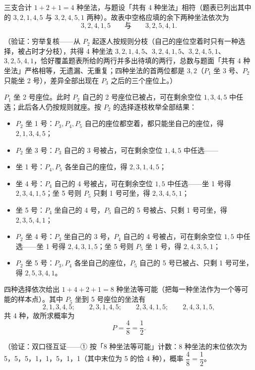 \begin{answer}
三支合计 \(1+2+1=4\) 种坐法，与题设「共有 4 种坐法」相符（题表已列出其中的 \(3,2,1,4,5\) 与 \(3,2,4,5,1\) 两种）。故表中空格应填的余下两种坐法依次为
\nopagebreak[4]
\[
3,2,4,1,5\qquad\text{与}\qquad 3,2,5,4,1 .
\]

（验证：穷举复核——从 \(P_{2}\) 起逐人按规则分枝（自己的座位空着时只有一种选择，被占时才分枝），共得 4 种坐法 \(3,2,1,4,5\)、\(3,2,4,1,5\)、\(3,2,4,5,1\)、\(3,2,5,4,1\)，恰好覆盖题表所给的两行并多出待填的两行，总数与题面「共有 4 种坐法」严格相等，无遗漏、无重复；四种坐法的首两位都是 \(3,2\)（\(P_{1}\) 坐 3 号、\(P_{2}\) 只能坐 2 号），差异全部出现在 \(P_{3}\) 之后的三个座位上。）


\(P_{1}\) 坐 2 号座位。此时 \(P_{2}\) 自己的 2 号座位已被占，可在剩余空位 \(1,3,4,5\) 中任选；此后各人仍按规则就座。按 \(P_{2}\) 的选择逐枝枚举全部结果：

\begin{itemize}
\item \(P_{2}\) 坐 1 号：\(P_{3},P_{4},P_{5}\) 自己的座位都空着，都只能坐自己的座位，得 \(2,1,3,4,5\)；
\item \(P_{2}\) 坐 3 号：\(P_{3}\) 自己的 3 号被占，可在剩余空位 \(1,4,5\) 中任选——
\item 坐 1 号：\(P_{4},P_{5}\) 各坐自己的座位，得 \(2,3,1,4,5\)；
\item 坐 4 号：\(P_{4}\) 自己的 4 号被占，可在剩余空位 \(1,5\) 中任选——坐 1 号得 \(2,3,4,1,5\)；坐 5 号则 \(P_{5}\) 只剩 1 号可坐，得 \(2,3,4,5,1\)；
\item 坐 5 号：\(P_{4}\) 坐自己的 4 号，\(P_{5}\) 自己的 5 号被占、只剩 1 号可坐，得 \(2,3,5,4,1\)；
\item \(P_{2}\) 坐 4 号：\(P_{3}\) 坐自己的 3 号，\(P_{4}\) 自己的 4 号被占，可在剩余空位 \(1,5\) 中任选——坐 1 号得 \(2,4,3,1,5\)；坐 5 号则 \(P_{5}\) 坐 1 号，得 \(2,4,3,5,1\)；
\item \(P_{2}\) 坐 5 号：\(P_{3},P_{4}\) 各坐自己的座位，\(P_{5}\) 自己的 5 号已被占、只剩 1 号可坐，得 \(2,5,3,4,1\)。
\end{itemize}

四种选择依次给出 \(1+4+2+1=8\) 种坐法等可能（把每一种坐法作为一个等可能的样本点）。其中 \(P_{5}\) 坐到 5 号座位的坐法有
\nopagebreak[4]
\[
2,1,3,4,5;\qquad 2,3,1,4,5;\qquad 2,3,4,1,5;\qquad 2,4,3,1,5,
\]
共 4 种，故所求概率为
\nopagebreak[4]
\[
P=\frac{4}{8}=\frac{1}{2}.
\]

（验证：双口径互证——① 按「8 种坐法等可能」计数：8 种坐法的末位依次为 5，5，5，1，1，5，1，1（其中末位为 5 的恰 4 种），概率 \(\dfrac{4}{8}=\dfrac{1}{2}\)。


\end{answer}
